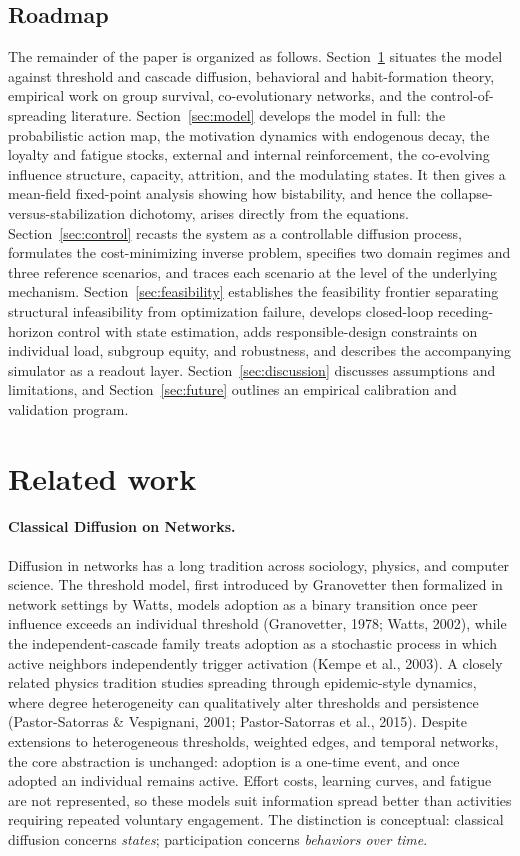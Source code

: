 \documentclass[11pt]{article}
\begin{document}
\subsection{Roadmap}
The remainder of the paper is organized as follows. Section~\ref{sec:related} situates the model against threshold and cascade diffusion, behavioral and habit-formation theory, empirical work on group survival, co-evolutionary networks, and the control-of-spreading literature. Section~\ref{sec:model} develops the model in full: the probabilistic action map, the motivation dynamics with endogenous decay, the loyalty and fatigue stocks, external and internal reinforcement, the co-evolving influence structure, capacity, attrition, and the modulating states. It then gives a mean-field fixed-point analysis showing how bistability, and hence the collapse-versus-stabilization dichotomy, arises directly from the equations. Section~\ref{sec:control} recasts the system as a controllable diffusion process, formulates the cost-minimizing inverse problem, specifies two domain regimes and three reference scenarios, and traces each scenario at the level of the underlying mechanism. Section~\ref{sec:feasibility} establishes the feasibility frontier separating structural infeasibility from optimization failure, develops closed-loop receding-horizon control with state estimation, adds responsible-design constraints on individual load, subgroup equity, and robustness, and describes the accompanying simulator as a readout layer. Section~\ref{sec:discussion} discusses assumptions and limitations, and Section~\ref{sec:future} outlines an empirical calibration and validation program.

\section{Related work}\label{sec:related}

\paragraph{Classical Diffusion on Networks.}
Diffusion in networks has a long tradition across sociology, physics, and computer science. The threshold model, first introduced by Granovetter then formalized in network settings by Watts, models adoption as a binary transition once peer influence exceeds an individual threshold (Granovetter, 1978; Watts, 2002), while the independent-cascade family treats adoption as a stochastic process in which active neighbors independently trigger activation (Kempe et al., 2003). A closely related physics tradition studies spreading through epidemic-style dynamics, where degree heterogeneity can qualitatively alter thresholds and persistence (Pastor-Satorras \& Vespignani, 2001; Pastor-Satorras et al., 2015). Despite extensions to heterogeneous thresholds, weighted edges, and temporal networks, the core abstraction is unchanged: adoption is a one-time event, and once adopted an individual remains active. Effort costs, learning curves, and fatigue are not represented, so these models suit information spread better than activities requiring repeated voluntary engagement. The distinction is conceptual: classical diffusion concerns \emph{states}; participation concerns \emph{behaviors over time}.
\end{document}

